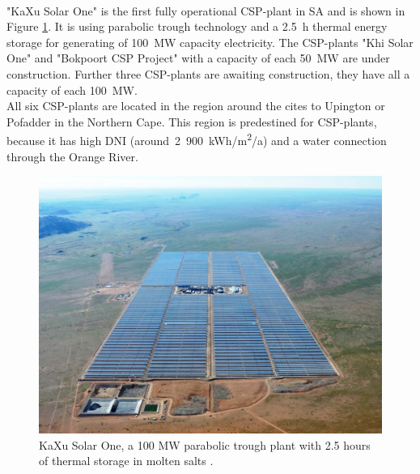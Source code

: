 \documentclass[Master,MEE,english]{twbook}%
\begin{document}
\\
"KaXu Solar One" is the first fully operational CSP-plant in SA and is shown in Figure \ref{KaXu-solar-field}. It is using parabolic trough technology and a 2.5~h thermal energy storage for generating of 100~MW capacity electricity. The CSP-plants "Khi Solar One" and "Bokpoort CSP Project" with a capacity of each 50~MW are under construction. Further three CSP-plants are awaiting construction, they have all a capacity of each 100~MW. \\
All six CSP-plants are located in the region around the cites to Upington or Pofadder in the Northern Cape. This region is predestined for CSP-plants, because it has high DNI (around~2~900~kWh/m\textsuperscript{2}/a) and a water connection through the Orange River. \cite{Forder2015}
\begin{figure}[!h]
\centering
\includegraphics[width=1\linewidth]{FIG/KaXu-solar-field}
\caption[KaXu Solar One, a 100 MW parabolic trough plant with 2.5 hours of thermal storage in molten salts.]{KaXu Solar One, a 100 MW parabolic trough plant with 2.5 hours of thermal storage in molten salts \cite{AbengoaSolar2015}.}\label{KaXu-solar-field}
\end{figure}\\
\pagebreak
\end{document}
